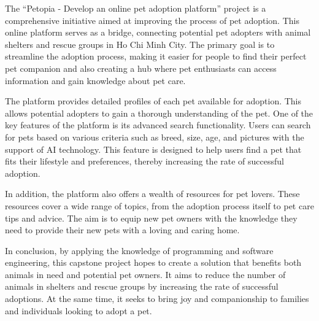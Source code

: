 The “Petopia - Develop an online pet adoption platform” project is a comprehensive initiative aimed at improving the process of pet adoption. This online platform serves as a bridge, connecting potential pet adopters with animal shelters and rescue groups in Ho Chi Minh City. The primary goal is to streamline the adoption process, making it easier for people to find their perfect pet companion and also creating a hub where pet enthusiasts can access information and gain knowledge about pet care.

The platform provides detailed profiles of each pet available for adoption. This allows potential adopters to gain a thorough understanding of the pet. One of the key features of the platform is its advanced search functionality. Users can search for pets based on various criteria such as breed, size, age, and pictures with the support of AI technology. This feature is designed to help users find a pet that fits their lifestyle and preferences, thereby increasing the rate of successful adoption.

In addition, the platform also offers a wealth of resources for pet lovers. These resources cover a wide range of topics, from the adoption process itself to pet care tips and advice. The aim is to equip new pet owners with the knowledge they need to provide their new pets with a loving and caring home.

In conclusion, by applying the knowledge of programming and software engineering, this capstone project hopes to create a solution that benefits both animals in need and potential pet owners. It aims to reduce the number of animals in shelters and rescue groups by increasing the rate of successful adoptions. At the same time, it seeks to bring joy and companionship to families and individuals looking to adopt a pet.
